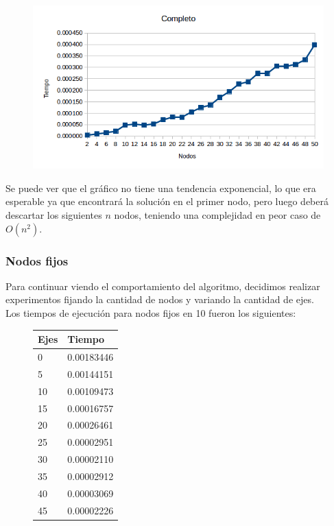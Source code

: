   \begin{figure}[h!]
   \begin{center}
 	\includegraphics[scale=0.7]{imagenes/exacto/Completos.png}
   \end{center}
 \end{figure}

Se puede ver que el gr\'afico no tiene una tendencia exponencial, lo que era esperable ya que encontrar\'a la soluci\'on en el primer nodo, pero luego deber\'a descartar los siguientes $n$ nodos,
teniendo una complejidad en peor caso de $O(n^2)$.\\

\newpage

\subsubsection{Nodos fijos}
Para continuar viendo el comportamiento del algoritmo, decidimos realizar experimentos fijando la cantidad de nodos y variando la cantidad de ejes.\\

Los tiempos de ejecuci\'on para nodos fijos en 10 fueron los siguientes:\\

  \begin{figure}[h!]
   \begin{center}
\begin{tabular}{| l | l |}
  \hline
  Ejes & Tiempo \\ \hline
  0 & 0.00183446 \\ \hline
  5 & 0.00144151 \\ \hline
  10 & 0.00109473 \\ \hline
  15 & 0.00016757 \\ \hline
  20 & 0.00026461 \\ \hline
  25 & 0.00002951 \\ \hline
  30 & 0.00002110 \\ \hline
  35 & 0.00002912 \\ \hline
  40 & 0.00003069 \\ \hline
  45 & 0.00002226 \\ \hline
\end{tabular}
   \end{center}
 \end{figure}
 
